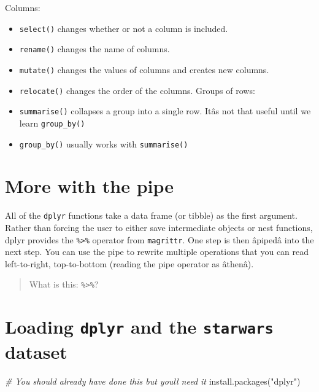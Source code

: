 \documentclass[
]{book}
\newenvironment{Shaded}{\begin{snugshade}}{\end{snugshade}}
\newcommand{\CommentTok}[1]{\textcolor[rgb]{0.56,0.35,0.01}{\textit{#1}}}
\newcommand{\FunctionTok}[1]{\textcolor[rgb]{0.00,0.00,0.00}{#1}}
\newcommand{\NormalTok}[1]{#1}
\newcommand{\StringTok}[1]{\textcolor[rgb]{0.31,0.60,0.02}{#1}}
\providecommand{\tightlist}{%
  \setlength{\itemsep}{0pt}\setlength{\parskip}{0pt}}
\begin{document}
Columns:

\begin{itemize}
\tightlist
\item
  \texttt{select()} changes whether or not a column is included.
\item
  \texttt{rename()} changes the name of columns.
\item
  \texttt{mutate()} changes the values of columns and creates new columns.
\item
  \texttt{relocate()} changes the order of the columns.
  Groups of rows:
\item
  \texttt{summarise()} collapses a group into a single row. Itâs not that useful until we learn \texttt{group\_by()}
\item
  \texttt{group\_by()} usually works with \texttt{summarise()}
\end{itemize}

\hypertarget{more-with-the-pipe}{%
\section{More with the pipe}\label{more-with-the-pipe}}

All of the \texttt{dplyr} functions take a data frame (or tibble) as the first argument. Rather than forcing the user to either save intermediate objects or nest functions, dplyr provides the \texttt{\%\textgreater{}\%} operator from \texttt{magrittr}. One step is then âpipedâ into the next step. You can use the pipe to rewrite multiple operations that you can read left-to-right, top-to-bottom (reading the pipe operator as âthenâ).

\begin{quote}
What is this: \texttt{\%\textgreater{}\%}?
\end{quote}

\hypertarget{loading-dplyr-and-the-starwars-dataset}{%
\section{\texorpdfstring{Loading \texttt{dplyr} and the \texttt{starwars} dataset}{Loading dplyr and the starwars dataset}}\label{loading-dplyr-and-the-starwars-dataset}}

\begin{Shaded}
\begin{Highlighting}[]
\CommentTok{\# You should already have done this but you\textquotesingle{}ll need it}
\FunctionTok{install.packages}\NormalTok{(}\StringTok{"dplyr"}\NormalTok{)}
\end{Highlighting}
\end{Shaded}
\end{document}
